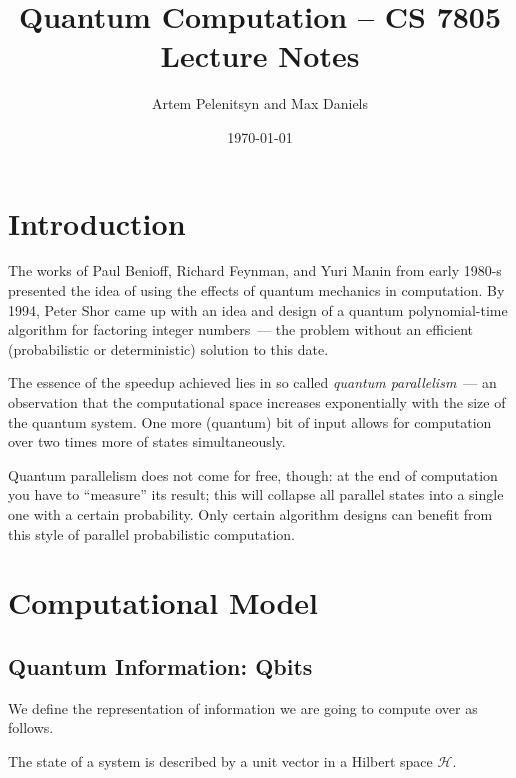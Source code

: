 \documentclass{article}
\begin{document}
\title{Quantum Computation -- CS 7805 Lecture Notes}

\author{Artem Pelenitsyn and Max Daniels}

\date{\today}

\maketitle

\tableofcontents 

\section*{Introduction}

The works of Paul Benioff, Richard Feynman, and Yuri Manin
from early 1980-s presented the idea of using the effects of quantum
mechanics in computation. By 1994, Peter Shor came up with an idea
and design of a quantum polynomial-time algorithm for factoring integer
numbers~--- the problem without an efficient (probabilistic or
deterministic) solution to this date.

The essence of the speedup achieved lies in so called \emph{quantum parallelism}~---
an observation that the computational space increases exponentially with
the size of the quantum system. One more (quantum) bit of input allows for computation
over two times more of states simultaneously.

Quantum parallelism
does not come for free, though: at the end of computation you have to ``measure''
its result; this will collapse all parallel states into a single one with a certain 
probability. Only certain algorithm designs can benefit from this style 
of parallel probabilistic computation.


\section{Computational Model}

\subsection{Quantum Information: Qbits}

We define the representation of information we are going to compute over as follows.

\begin{post}
The state of a system is described by a unit vector in a Hilbert space $\mathcal H$.
\end{post}
\end{document}
